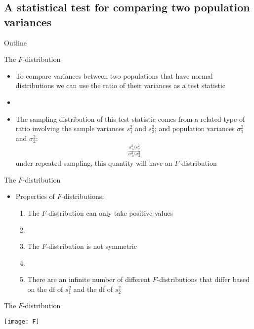 \documentclass[xcolor=dvipsnames]{beamer}
\begin{document}
\subsection{A statistical test for comparing two population variances}
\begin{frame}{Outline}
	\tableofcontents[currentsection,subsectionstyle=show/shaded/hide]
\end{frame}

\begin{frame}{The $F$-distribution}
	\begin{itemize}
		\item To compare variances between two populations that have normal distributions we can use the ratio of their variances as a test statistic \pause
		\item[]
		\item The sampling distribution of this test statistic comes from a related type of ratio involving the sample variances $s_1^2$ and $s_2^2$; and population variances $\sigma_1^2$ and $\sigma_2^2$: \pause
		\begin{gather*}
		\frac{s_1^2 / s_2^2}{\sigma_1^2 / \sigma_2^2}
		\end{gather*}
		under repeated sampling, this quantity will have an $F$-distribution
	\end{itemize}
\end{frame}

\begin{frame}{The $F$-distribution}
	\begin{itemize}
		\item Properties of $F$-distributions: \pause
		\begin{enumerate}
			\item The $F$-distribution can only take positive values \pause
			\item[]
			\item The $F$-distribution is not symmetric \pause
			\item[]
			\item There are an infinite number of different $F$-distributions that differ based on the df of $s_1^2$ and the df of $s_2^2$
			\end{enumerate}
	\end{itemize}
\end{frame}

\begin{frame}{The $F$-distribution}
	\begin{center}
		\texttt{[image: F]}
	\end{center}
\end{frame}
\end{document}
